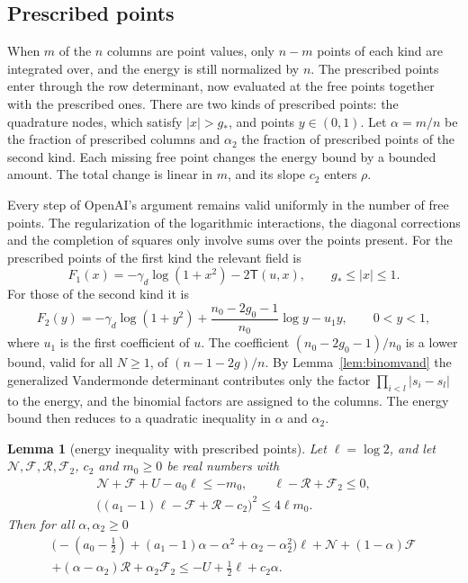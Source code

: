 \documentclass[11pt]{amsart}
\newtheorem{lemma}[theorem]{Lemma}
\theoremstyle{definition}
\theoremstyle{remark}
\numberwithin{equation}{section}
\begin{document}
\subsection{Prescribed points}
When $m$ of the $n$ columns are point values, only $n-m$ points of each kind are integrated over, and the
energy is still normalized by $n$. The prescribed points enter through the row determinant, now evaluated
at the free points together with the prescribed ones. There are two kinds of prescribed points: the
quadrature nodes, which satisfy $|x|>g_*$, and points $y\in(0,1)$. Let $\alpha=m/n$ be the fraction of
prescribed columns and $\alpha_2$ the fraction of prescribed points of the second kind. Each missing free point
changes the energy bound by a bounded amount. The total change is linear in $m$, and its slope $c_2$ enters
$\rho$.

Every step of OpenAI's argument remains valid uniformly in the number of free points. The regularization of
the logarithmic interactions, the diagonal corrections and the completion of squares only involve sums over
the points present. For the prescribed points of the first kind the relevant field is
\[
 F_1(x)=-\gamma_d\log(1+x^2)-2\mathsf T(u,x),\qquad g_*\le|x|\le1 .
\]
For those of the second kind it is
\[
 F_2(y)=-\gamma_d\log(1+y^2)+\frac{n_0-2g_0-1}{n_0}\log y-u_1y,\qquad0<y<1,
\]
where $u_1$ is the first coefficient of $u$. The coefficient $(n_0-2g_0-1)/n_0$ is a lower bound, valid for all
$N\ge1$, of $(n-1-2g)/n$. By Lemma~\ref{lem:binomvand} the generalized Vandermonde determinant contributes only
the factor $\prod_{i<l}|s_i-s_l|$ to the energy, and the binomial factors are assigned to the columns. The
energy bound then reduces to a quadratic inequality in $\alpha$ and $\alpha_2$.

\begin{lemma}[energy inequality with prescribed points]\label{lem:energy-ineq}
Let $\ell=\log2$, and let $\mathcal N,\mathcal F,\mathcal R,\mathcal F_2$, $c_2$ and $m_0\ge0$ be real numbers
with
\begin{gather*}
 \mathcal N+\mathcal F+U-a_0\ell\le-m_0,\qquad \ell-\mathcal R+\mathcal F_2\le0,\\
 \bigl((a_1-1)\ell-\mathcal F+\mathcal R-c_2\bigr)^2\le4\ell m_0 .
\end{gather*}
Then for all $\alpha,\alpha_2\ge0$
\begin{multline*}
 \bigl(-(a_0-\tfrac12)+(a_1-1)\alpha-\alpha^2+\alpha_2-\alpha_2^2\bigr)\ell+\mathcal N+(1-\alpha)\mathcal F\\
 +(\alpha-\alpha_2)\mathcal R+\alpha_2\mathcal F_2\le-U+\tfrac12\ell+c_2\alpha .
\end{multline*}
\end{lemma}
\end{document}
